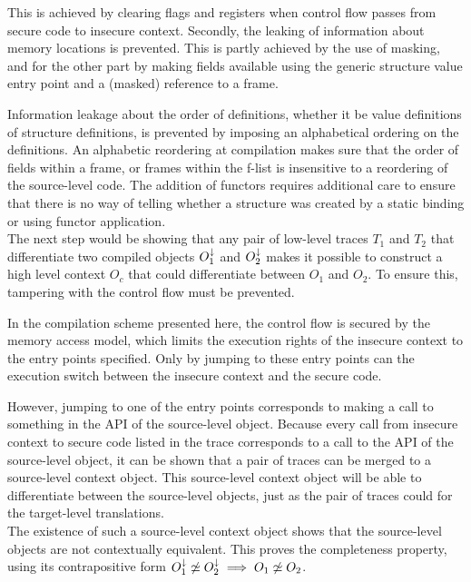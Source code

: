 This is achieved by clearing flags and registers\cite{Agten:2012:SCM:2354412.2355247} when control flow passes from secure code to insecure context.
Secondly, the leaking of information about memory locations is prevented.
This is partly achieved by the use of  masking\cite{Patrignani}, and for the other part by making fields available using the generic structure value entry point and a (masked) reference to a frame.

Information leakage about the order of definitions, whether it be value definitions of structure definitions, is prevented by imposing an alphabetical ordering on the definitions.
An alphabetic reordering at compilation makes sure that the order of fields within a frame, or frames within the f-list is insensitive to a reordering of the source-level code.
The addition of functors requires additional care to ensure that there is no way of telling whether a structure was created by a static binding or using functor application.
\\[1em]
The next step would be showing that any pair of low-level traces $T_1$ and $T_2$ that differentiate two compiled objects $O_1^{\downarrow}$ and $O_2^{\downarrow}$ makes it possible to construct a high level context $O_c$ that could differentiate between $O_1$ and $O_2$.
To ensure this, tampering with the control flow must be prevented.

In the compilation scheme presented here, the control flow is secured by the memory access model, which limits the execution rights of the insecure context to the entry points specified.
Only by jumping to these entry points can the execution switch between the insecure context and the secure code.

However, jumping to one of the entry points corresponds to making a call to something in the API of the source-level object.
Because every call from insecure context to secure code listed in the trace corresponds to a call to the API of the source-level object, it can be shown that a pair of traces can be merged to a source-level context object. 
This source-level context object will be able to differentiate between the source-level objects, just as the pair of traces could for the target-level translations.
\\[1em]
The existence of such a source-level context object shows that the source-level objects are not contextually equivalent.
This proves the completeness property, using its contrapositive form $O_{1}^{\downarrow} \not\simeq O_{2}^{\downarrow} \implies O_{1} \not\simeq O_{2}$.
